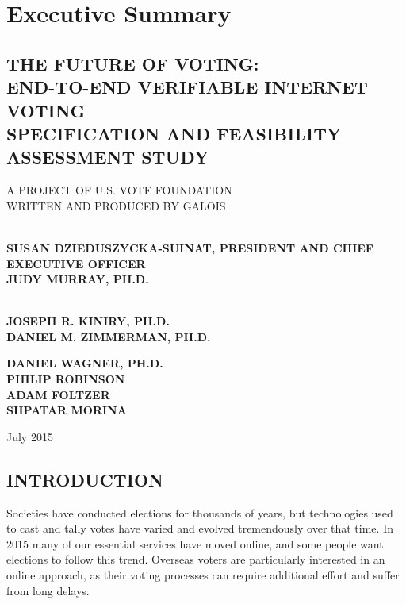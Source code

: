 \chapter*{Executive Summary}
\label{chapter:executive_summary}

\section*{THE FUTURE OF VOTING: \\
  END-TO-END VERIFIABLE INTERNET VOTING \\
  SPECIFICATION AND FEASIBILITY ASSESSMENT STUDY}

\noindent A PROJECT OF U.S. VOTE FOUNDATION \\
\noindent WRITTEN AND PRODUCED BY GALOIS \\

\newpage

\\
\noindent \textbf{SUSAN DZIEDUSZYCKA-SUINAT, PRESIDENT AND CHIEF
  EXECUTIVE OFFICER}\\
\noindent \textbf{JUDY MURRAY, PH.D.}\\

\vspace{1cm}

\\
\noindent \textbf{JOSEPH R. KINIRY, PH.D.}\\
\noindent \textbf{DANIEL M. ZIMMERMAN, PH.D.}

\noindent \textbf{DANIEL WAGNER, PH.D.}\\
\noindent \textbf{PHILIP ROBINSON}\\
\noindent \textbf{ADAM FOLTZER}\\
\noindent \textbf{SHPATAR MORINA}

\vspace{3cm}

\noindent July 2015

\newpage

\section*{INTRODUCTION}

Societies have conducted elections for thousands of years, but
technologies used to cast and tally votes have varied and evolved
tremendously over that time. In 2015 many of our essential services
have moved online, and some people want elections to follow this
trend. Overseas voters are particularly interested in an online
approach, as their voting processes can require additional effort and
suffer from long delays.

